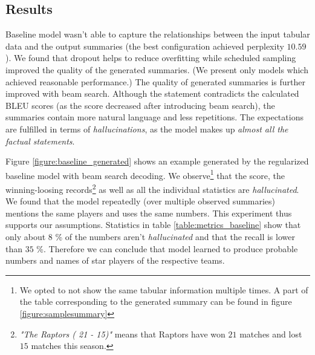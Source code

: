 \subsection{Results}

Baseline model wasn't able to capture the relationships between the input tabular data and the output summaries (the best configuration achieved perplexity $10.59$). We found that dropout helps to reduce overfitting while scheduled sampling improved the quality of the generated summaries. (We present only models which achieved reasonable performance.) The quality of generated summaries is further improved with beam search. Although the statement contradicts the calculated BLEU scores (as the score decreased after introducing beam search), the summaries contain more natural language and less repetitions. The expectations are fulfilled in terms of \emph{hallucinations}, as the model makes up \emph{almost all the factual statements}.

Figure \ref{figure:baseline_generated} shows an example generated by the regularized baseline model with beam search decoding. We observe\footnote{We opted to not show the same tabular information multiple times. A part of the table corresponding to the generated summary can be found in figure \ref{figure:samplesummary}} that the score, the winning-loosing records\footnote{\emph{"The Raptors ( 21 - 15)"} means that Raptors have won $21$ matches and lost $15$ matches this season.} as well as all the individual statistics are \emph{hallucinated}. We found that the model repeatedly (over multiple observed summaries) mentions the same players and uses the same numbers. This experiment thus supports our assumptions. Statistics in table \ref{table:metrics_baseline} show that only about $8$ \% of the numbers aren't \emph{hallucinated} and that the recall is lower than $35$ \%. Therefore we can conclude that model learned to produce probable numbers and names of star players of the respective teams. 

